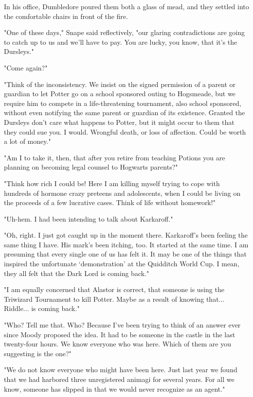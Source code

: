 In his office, Dumbledore poured them both a glass of mead, and they settled into the comfortable chairs in front of the fire.

"One of these days," Snape said reflectively, "our glaring contradictions are going to catch up to us and we'll have to pay. You are lucky, you know, that it's the Dursleys."

"Come again?"

"Think of the inconsistency. We insist on the signed permission of a parent or guardian to let Potter go on a school sponsored outing to Hogsmeade, but we require him to compete in a life-threatening tournament, also school sponsored, without even notifying the same parent or guardian of its existence. Granted the Dursleys don't care what happens to Potter, but it might occur to them that they could sue you. I would. Wrongful death, or loss of affection. Could be worth a lot of money."

"Am I to take it, then, that after you retire from teaching Potions you are planning on becoming legal counsel to Hogwarts parents?"

"Think how rich I could be! Here I am killing myself trying to cope with hundreds of hormone crazy preteens and adolescents, when I could be living on the proceeds of a few lucrative cases. Think of life without homework!"

"Uh-hem. I had been intending to talk about Karkaroff."

"Oh, right. I just got caught up in the moment there. Karkaroff's been feeling the same thing I have. His mark's been itching, too. It started at the same time. I am presuming that every single one of us has felt it. It may be one of the things that inspired the unfortunate `demonstration' at the Quidditch World Cup. I mean, they all felt that the Dark Lord is coming back."

"I am equally concerned that Alastor is correct, that someone is using the Triwizard Tournament to kill Potter. Maybe as a result of knowing that... Riddle... is coming back."

"Who? Tell me that. Who? Because I've been trying to think of an answer ever since Moody proposed the idea. It had to be someone in the castle in the last twenty-four hours. We know everyone who was here. Which of them are you suggesting is the one?"

"We do not know everyone who might have been here. Just last year we found that we had harbored three unregistered animagi for several years. For all we know, someone has slipped in that we would never recognize as an agent."

